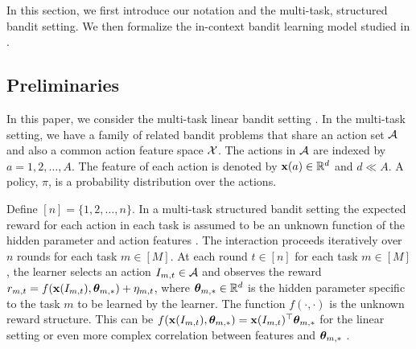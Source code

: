 In this section, we first introduce our notation and the multi-task, structured bandit setting. 
% 
We then formalize the in-context bandit learning model studied in \citet{laskin2022context, lee2023supervised, sinii2023context, lin2023transformers, ma2023rethinking, liu2023reason, liu2023self}. 
% 




\subsection{Preliminaries}

In this paper, we consider the multi-task linear bandit setting \citep{du2023multi, yang2020impact, yang2022nearly}.  
%
In the multi-task setting, we have a family of related bandit problems that share an action set $\mathcal{A}$ and also a common action feature space $\mathcal{X}$.
%
The actions in $\mathcal{A}$ are indexed by $a=1,2,\ldots, A$. The feature of each action is denoted by $\mathbf{x}(a) \in \mathbb{R}^d$ and $d \ll A$. 
%
%
A policy, $\pi$, is a probability distribution over the actions.

Define $[n] = \{1,2,\ldots,n\}$. 
In a multi-task structured bandit setting the expected reward for each action in each task is assumed to be an unknown function of the hidden parameter and action features \citep{lattimore2020bandit, gupta2020unified}.
%
The interaction proceeds iteratively over $n$ rounds for each task $m\in [M]$.
%
At each round $t\in [n]$ for each task $m\in [M]$, the learner selects an action $I_{m,t} \in \mathcal{A}$ and observes the reward $r_{m,t} = f(\mathbf{x}(I_{m,t}), \boldsymbol{\theta}_{m,*}) + \eta_{m,t}$, where $\boldsymbol{\theta}_{m,*}\in\mathbb{R}^d$ is the hidden parameter specific to the task $m$ to be learned by the learner. The function $f(\cdot, \cdot)$ is the unknown reward structure. This can be $f(\mathbf{x}(I_{m,t}), \boldsymbol{\theta}_{m,*}) = \mathbf{x}(I_{m,t})^\top\boldsymbol{\theta}_{m,*}$ for the linear setting or even more complex correlation between features and $\boldsymbol{\theta}_{m,*}$ \citep{filippi2010parametric, abbasi2011improved,  riquelme2018deep, lattimore2019information, dong2021provable}.
%

